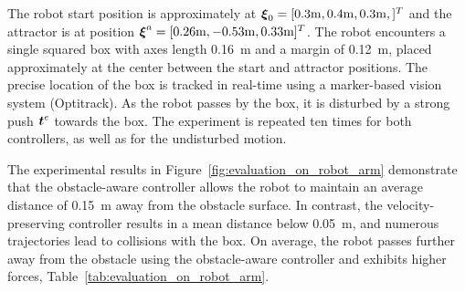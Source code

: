 The robot start position is approximately at $\boldsymbol{\xi}_0 = [0.3\mathrm{m}, 0.4\mathrm{m}, 0.3\mathrm{m},]^T$ and the attractor is at position $\boldsymbol{\xi}^a = [0.26 \mathrm{m}, -0.53\mathrm{m}, 0.33\mathrm{m}]^T$.
The robot encounters a single squared box with axes length \qty{0.16}{m} and a margin of \qty{0.12}{m}, placed approximately at the center between the start and attractor positions. The precise location of the box is tracked in real-time using a marker-based vision system (Optitrack). As the robot passes by the box, it is disturbed by a strong push $\boldsymbol{t}^e$ towards the box. The experiment is repeated ten times for both controllers, as well as for the undisturbed motion.

The experimental results in Figure~\ref{fig:evaluation_on_robot_arm} demonstrate that the obstacle-aware controller allows the robot to maintain an average distance of \qty{0.15}{m} away from the obstacle surface. In contrast, the velocity-preserving controller results in a mean distance below \qty{0.05}{m}, and numerous trajectories lead to collisions with the box. On average, the robot passes further away from the obstacle using the obstacle-aware controller and exhibits higher forces, Table~\ref{tab:evaluation_on_robot_arm}.

